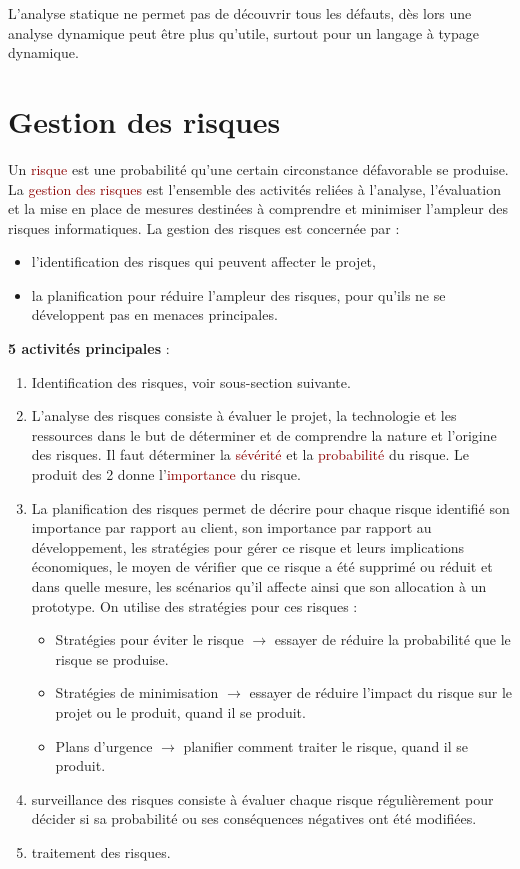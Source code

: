 \documentclass{article}
\newcommand{\ora}[1]{\textcolor{darko}{#1}}
\newcommand{\rouge}[1]{\textcolor{darkred}{#1}}
\begin{document}
\begin{sffamily}
L'analyse statique ne permet pas de découvrir tous les défauts, dès lors une analyse dynamique peut être plus qu'utile, surtout
pour un langage à typage dynamique.
\section{Gestion des risques}

Un \rouge{risque} est une probabilité qu'une certain circonstance défavorable se produise. \\
La \rouge{gestion des risques} est l'ensemble des activités reliées à l'analyse, l'évaluation et la mise en place de mesures 
destinées à comprendre et minimiser l'ampleur des risques informatiques. La gestion des risques est concernée par : 
\begin{itemize}
\item l'identification des risques qui peuvent affecter le projet,
\item la planification pour réduire l'ampleur des risques, pour qu'ils ne se développent pas en menaces principales.\\
\end{itemize}

\textbf{5 activités principales} :
\begin{enumerate}
\item \ora{Identification des risques}, voir sous-section suivante.
\item L'\ora{analyse des risques} consiste à évaluer le projet, la technologie et les ressources dans le but de déterminer et de 
comprendre la nature et l'origine des risques. Il faut déterminer la \rouge{sévérité} et la \rouge{probabilité} du risque. Le 
produit des 2 donne l'\rouge{importance} du risque.
\item La \ora{planification des risques} permet de décrire pour chaque risque identifié son importance par rapport au client, 
son importance par rapport au développement, les stratégies pour gérer ce risque et leurs implications économiques, le moyen de
vérifier que ce risque a été supprimé ou réduit et dans quelle mesure, les scénarios qu'il affecte ainsi que son allocation à un 
prototype. On utilise des stratégies pour ces risques :
\begin{itemize}
\item Stratégies pour éviter le risque $\rightarrow$ essayer de réduire la probabilité que le risque se produise.
\item Stratégies de minimisation $\rightarrow$ essayer de réduire l'impact du risque sur le projet ou le produit, quand il se 
produit.
\item Plans d'urgence $\rightarrow$ planifier comment traiter le risque, quand il se produit.
\end{itemize}
\item \ora{surveillance des risques} consiste à évaluer chaque risque régulièrement pour décider si sa probabilité ou ses 
conséquences négatives ont été modifiées.
\item \ora{traitement des risques}.
\end{enumerate}




\end{sffamily}
\end{document}
